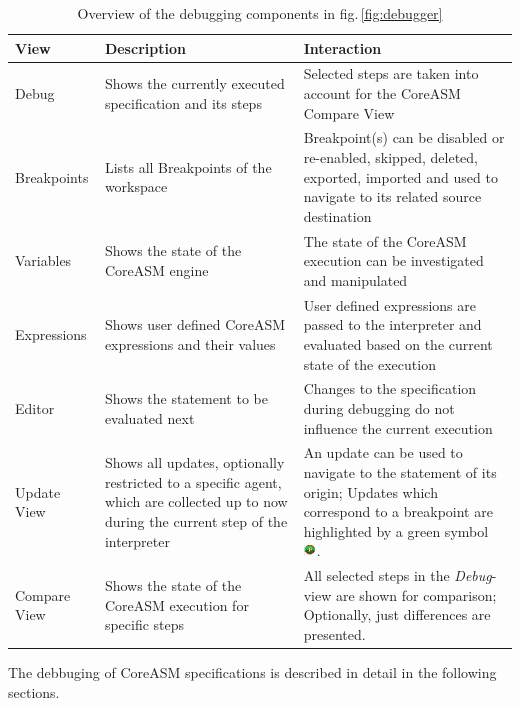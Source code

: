 \documentclass[10pt,oneside,a4paper]{article}
\begin{document}
\begin{table}[h]
\centering
\label{table:debugger}
\caption{Overview of the debugging components in fig.\,\ref{fig:debugger}}
	\begin{tabular}{|p{}|p{}|p{}|}
	\hline
	\textbf
	\textbf{View} & \textbf{Description} & \textbf{Interaction}\\
	\hline
	Debug & Shows the currently executed specification and its steps & Selected steps are taken into account for the CoreASM Compare View\\
	\hline
	Breakpoints & Lists all Breakpoints of the workspace & Breakpoint(s) can be disabled or re-enabled, skipped, deleted, exported, imported and used to navigate to its related source destination\\
	\hline
	Variables & Shows the state of the CoreASM engine & The state of the CoreASM execution can be investigated and manipulated\\
	\hline
	Expressions & Shows user defined CoreASM expressions and their values & User defined expressions are passed to the interpreter and evaluated based on the current state of the execution\\
	\hline
	Editor & Shows the statement to be evaluated next & Changes to the specification during debugging do not influence the current execution\\
	\hline
	Update View & Shows all updates, optionally restricted to a specific agent, which are collected up to now during the current step of the interpreter & An update can be used to navigate to the statement of its origin; Updates which correspond to a breakpoint are highlighted by a green symbol \includegraphics[height=0.8em]{images/breakpoint-update.png}.\\
	\hline
	Compare View & Shows the state of the CoreASM execution for specific steps & All selected steps in the \emph{Debug}-view are shown for comparison; Optionally, just differences are presented.\\
	\hline
	\end{tabular}
\end{table}
The debbuging of CoreASM specifications is described in detail in the following sections.
\end{document}
